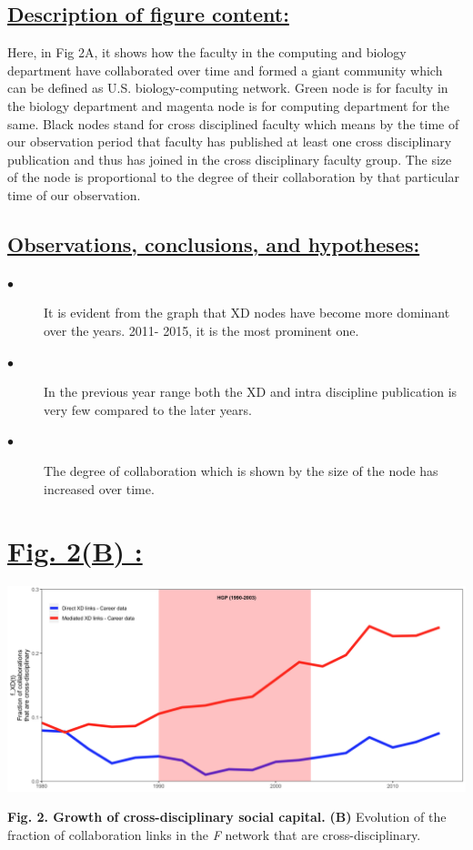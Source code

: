 \documentclass{article}\usepackage[]{graphicx}\usepackage[]{color}
\begin{document}
\subsection*{\underline{Description of figure content:}}
\par{Here, in Fig 2A, it shows how the faculty in the computing and biology department have collaborated over time and formed a giant community which can be defined as U.S. biology-computing network. Green node is for faculty in the biology department and magenta node is for computing department for the same. Black nodes stand for cross disciplined faculty which means by the time of our observation period that faculty has published at least one cross disciplinary publication and thus has joined in the cross disciplinary faculty group. The size of the node is proportional to the degree of their collaboration by that particular time of our observation.}
\subsection*{\underline{Observations, conclusions, and hypotheses:}}
\begin{description}
  \item[$\bullet$] It is evident from the graph that XD nodes have become more dominant over the years. 2011- 2015, it is the most prominent one.
  \item[$\bullet$] In the previous year range both the XD and intra discipline publication is very few compared to the later years.
  \item[$\bullet$] The degree of collaboration which is shown by the size of the node has increased over time.
\end{description}

\newpage
\section*{\underline{Fig. 2(B) :}}
\begin{center}
\includegraphics[scale=0.4]{2B.png}
\newline
\par{\textbf{Fig. 2. Growth of cross-disciplinary social capital.} \textbf{(B)} Evolution of the fraction of collaboration links in the \textit{F} network that are cross-disciplinary.}
\end{center}
\end{document}
